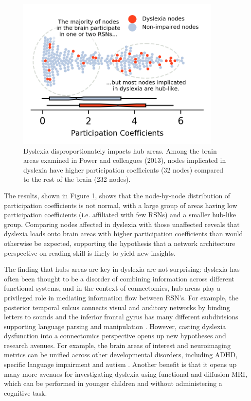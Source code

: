 \begin{figure}[t]
\centering
\includegraphics[height=3in]{images/ch1-dyslexia-hubs.png}
    \caption[Dyslexia disproportionately impacts hub areas]{Dyslexia disproportionately impacts hub areas. Among the brain areas examined in Power and colleagues (2013), nodes implicated in dyslexia have higher participation coefficients (32 nodes) compared to the rest of the brain (232 nodes).}
\label{fig:ch1-dyslexia-hubs}
\end{figure}

The results, shown in Figure \ref{fig:ch1-dyslexia-hubs}, shows that the node-by-node distribution of participation coefficients is not normal, with a large group of areas having low participation coefficients (i.e. affiliated with few RSNs) and a smaller hub-like group. Comparing nodes affected in dyslexia with those unaffected reveals that dyslexia loads onto brain areas with higher participation coefficients than would otherwise be expected, supporting the hypothesis that a network architecture perspective on reading skill is likely to yield new insights. 

The finding that hubs areas are key in dyslexia are not surprising: dyslexia has often been thought to be a disorder of combining information across different functional systems, and in the context of connectomics, hub areas play a privileged role in mediating information flow between RSN’s. For example, the posterior temporal sulcus connects visual and auditory networks by binding letters to sounds \citep{Blau2010, VanAtteveldt2009} and the inferior frontal gyrus has many different subdivisions supporting language parsing and manipulation \citep{Hagoort2005}. However, casting dyslexia dysfunction into a connectomics perspective opens up new hypotheses and research avenues. For example, the brain areas of interest and neuroimaging metrics can be unified across other developmental disorders, including ADHD, specific language impairment and autism \citep{Stam2014}. Another benefit is that it opens up many more avenues for investigating dyslexia using functional and diffusion MRI, which can be performed in younger children and without administering a cognitive task. 


